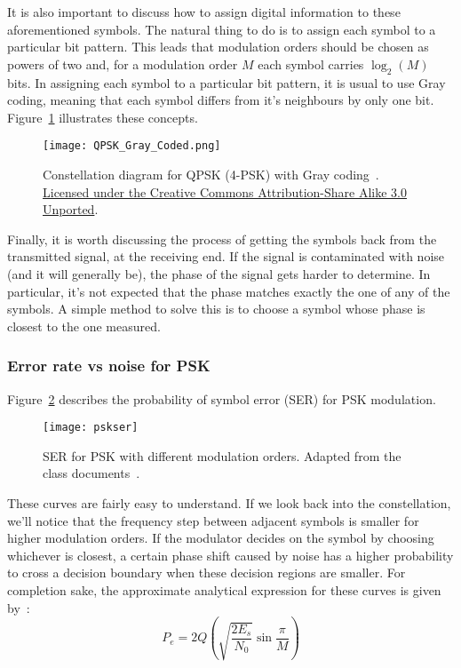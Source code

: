 It is also important to discuss how to assign digital information to these
aforementioned symbols. The natural thing to do is to assign each symbol to a
particular bit pattern. This leads that modulation orders should be chosen as
powers of two and, for a modulation order \(M\) each symbol carries
\(\log_{2}(M)\) bits. In assigning each symbol to a particular bit pattern, it is
usual to use Gray coding, meaning that each symbol differs from it's neighbours by
only one bit. Figure~\ref{fig:pskfig} illustrates these concepts.
\begin{figure}
    \centering
    \texttt{[image: QPSK\_Gray\_Coded.png]}
    \caption{Constellation diagram for QPSK (4-PSK) with Gray
        coding~\cite{wikipskconst}.
        \href{https://creativecommons.org/licenses/by-sa/3.0/deed.en}
        {Licensed under the Creative Commons Attribution-Share Alike 3.0
            Unported}.\label{fig:pskfig}}
\end{figure}

Finally, it is worth discussing the process of getting the symbols back from the
transmitted signal, at the receiving end. If the signal is contaminated with noise
(and it will generally be), the phase of the signal gets harder to determine. In
particular, it's not expected that the phase matches exactly the one of any of the
symbols. A simple method to solve this is to choose a symbol whose phase is
closest to the one measured.

\subsubsection{Error rate vs noise for PSK}

Figure~\ref{fig:pskser} describes the probability of symbol error (SER) for PSK
modulation.
\begin{figure}
    \centering
    \texttt{[image: pskser]}
    \caption{SER for PSK with different modulation orders. Adapted from the class
        documents~\cite{slidesaulas}\label{fig:pskser}.}
\end{figure}
These curves are fairly easy to understand. If we look back into the
constellation, we'll notice that the frequency step between adjacent symbols is
smaller for higher modulation orders. If the modulator decides on the symbol by
choosing whichever is closest, a certain phase shift caused by noise has a higher
probability to cross a decision boundary when these decision regions are smaller.
For completion sake, the approximate analytical expression for these curves is
given by~\cite{slidesaulas}:
\begin{equation}
    P_e = 2Q \left( \sqrt{\frac{2E_s}{N_0}}\sin\frac{\pi}{M} \right)
\end{equation}

